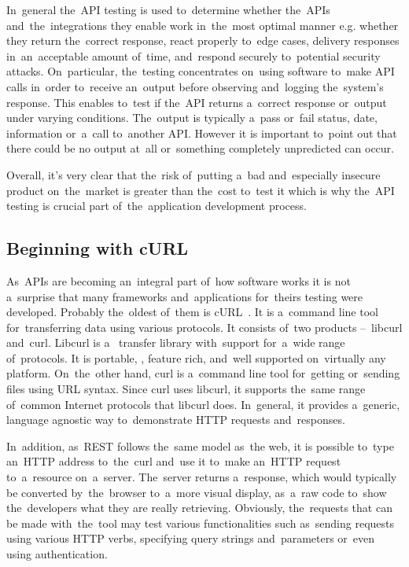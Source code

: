 In~general the~API testing is used to~determine whether the~APIs
and~the~integrations they enable work in~the~most optimal manner e.g. whether
they return the~correct response, react properly to~edge cases, delivery
responses in~an~acceptable amount of~time, and~respond securely to~potential
security attacks. On~particular, the~testing concentrates on~using software
to~make API calls in~order to~receive an~output before observing and~logging
the~system's response. This enables to~test if the~API returns a~correct
response or~output under varying conditions. The~output is typically a~pass
or~fail status, date, information or~a~call to~another API. However it is
important to~point out that there could be no output at~all or~something
completely unpredicted can occur.

Overall, it's very clear that the~risk of~putting a~bad and~especially insecure
product on~the~market is greater than the~cost to~test it which is why the~API
testing is crucial part of~the~application development process.


\subsection{Beginning with cURL}
As~APIs are becoming an~integral part of~how software works it is not
a~surprise that many frameworks and~applications for~theirs testing were
developed. Probably the~oldest of~them is cURL~\cite{cURL}. It is a~command line
tool for~transferring data using various protocols. It consists of~two products
--~libcurl and~curl. Libcurl is a~ transfer library with~support
for~a~wide range of~protocols. It is portable, , feature rich,
and~well supported on~virtually any platform. On~the~other hand, curl is
a~command line tool for~getting or~sending files using URL syntax. Since curl
uses libcurl, it supports the~same range of~common Internet protocols that
libcurl does. In~general, it provides a~generic, language agnostic way
to~demonstrate HTTP requests and~responses.

In~addition, as~REST follows the~same model as~the web, it is possible to~type
an~HTTP address to~the~curl and~use it to~make an~HTTP request to~a~resource
on~a~server. The~server returns a~response, which would typically be converted
by~the~browser to~a~more visual display, as~a~raw code to~show the~developers
what they are really retrieving. Obviously, the~requests that can be made
with~the~tool may test various functionalities such as~sending requests using
various HTTP verbs, specifying query strings and~parameters or~even using
authentication.

